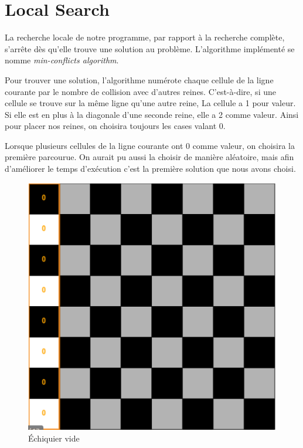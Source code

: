 \documentclass{article}
\begin{document}
\section{Local Search}

La recherche locale de notre programme, par rapport à la recherche complète, s'arrête dès qu'elle trouve une solution au problème. L'algorithme implémenté se nomme
\emph{min-conflicts algorithm}. 

Pour trouver une solution, l'algorithme numérote chaque cellule de la ligne courante par le nombre de collision avec d'autres reines. C'est-à-dire, si une cellule se trouve sur la même ligne qu'une autre reine, La cellule a 1 pour valeur. Si elle est en plus à la diagonale d'une seconde reine, elle a 2 comme valeur.
Ainsi pour placer nos reines, on choisira toujours les cases valant 0.

Lorsque plusieurs cellules de la ligne courante ont 0 comme valeur, on choisira la première parcourue. On aurait pu aussi la choisir de manière aléatoire, mais afin d'améliorer le temps d'exécution c'est la première solution que nous avons choisi. 


\begin{figure}[!h]
	\caption{\label{local1} Échiquier vide}
	\begin{center}
	\includegraphics[scale=0.3]{./picture/local1.png}
	\end{center}
\end{figure}
\end{document}
